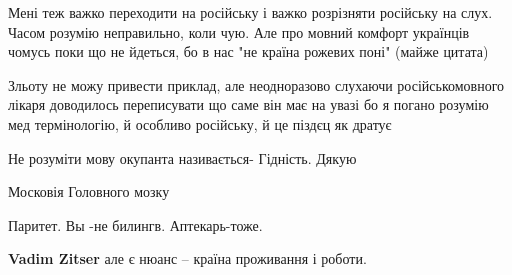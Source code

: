 \begin{itemize}
Мені теж важко переходити на російську і важко розрізняти російську на слух.
Часом розумію неправильно, коли чую. Але про мовний комфорт українців чомусь
поки що не йдеться, бо в нас "не країна рожевих поні" (майже цитата)


 

Зльоту не можу привести приклад, але неодноразово слухаючи російськомовного
лікаря доводилось переписувати що саме він має на увазі бо я погано розумію мед
термінологію, й особливо російську, й це піздєц як дратує

 
Не розуміти мову окупанта називається- Гідність. Дякую

 
Московія Головного мозку

 
Паритет.
Вы -не билингв.
Аптекарь-тоже.

\begin{itemize}
 
\textbf{Vadim Zitser} але є нюанс – країна проживання і роботи.


 

\end{itemize}
\end{itemize}
